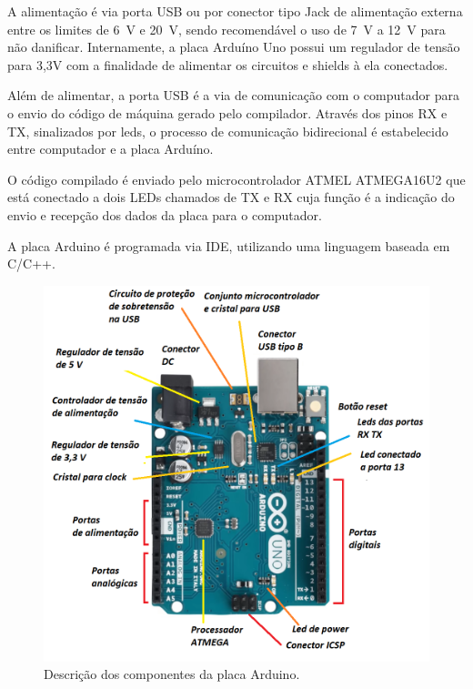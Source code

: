 A alimentação é via porta \ac{USB} ou por conector tipo Jack de alimentação externa entre os 
limites de 6~V e 20~V, sendo recomendável o uso de 7~V a 12~V para não danificar. Internamente, 
a placa Arduíno Uno possui um regulador de tensão para 3,3V com a finalidade de alimentar 
os circuitos e shields à ela conectados.

Além de alimentar, a porta \ac{USB} é a via de comunicação com o computador para o envio do código de máquina 
gerado pelo compilador. Através dos pinos RX e TX, sinalizados por leds, o processo de comunicação 
bidirecional é estabelecido entre computador e a placa Arduíno.


O código compilado é enviado pelo microcontrolador ATMEL ATMEGA16U2 que está 
conectado a dois LEDs chamados de TX e RX cuja função é a indicação do envio e recepção dos dados da 
placa para o computador.

A placa Arduino é programada via \ac{IDE}, utilizando uma linguagem baseada em C/C++.

\begin{figure}[H]
\centering
\caption{Descrição dos componentes da placa Arduino.}\label{fig:placaarduino}
\includegraphics[scale = 0.6]{figuras/placaarduino}
\end{figure}
    
